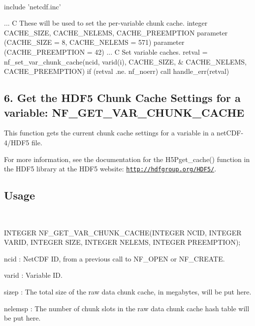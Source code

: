  

\begin{DoxyVerb}  include 'netcdf.inc'
\end{DoxyVerb}
 ... C These will be used to set the per-\/variable chunk cache. integer C\+A\+C\+H\+E\+\_\+\+S\+I\+ZE, C\+A\+C\+H\+E\+\_\+\+N\+E\+L\+E\+MS, C\+A\+C\+H\+E\+\_\+\+P\+R\+E\+E\+M\+P\+T\+I\+ON parameter (C\+A\+C\+H\+E\+\_\+\+S\+I\+ZE = 8, C\+A\+C\+H\+E\+\_\+\+N\+E\+L\+E\+MS = 571) parameter (C\+A\+C\+H\+E\+\_\+\+P\+R\+E\+E\+M\+P\+T\+I\+ON = 42) ... C Set variable caches. retval = nf\+\_\+set\+\_\+var\+\_\+chunk\+\_\+cache(ncid, varid(i), C\+A\+C\+H\+E\+\_\+\+S\+I\+ZE, \& C\+A\+C\+H\+E\+\_\+\+N\+E\+L\+E\+MS, C\+A\+C\+H\+E\+\_\+\+P\+R\+E\+E\+M\+P\+T\+I\+ON) if (retval .ne. nf\+\_\+noerr) call handle\+\_\+err(retval)

\subsection*{6. Get the H\+D\+F5 Chunk Cache Settings for a variable\+: N\+F\+\_\+\+G\+E\+T\+\_\+\+V\+A\+R\+\_\+\+C\+H\+U\+N\+K\+\_\+\+C\+A\+C\+HE }

This function gets the current chunk cache settings for a variable in a net\+C\+D\+F-\/4/\+H\+D\+F5 file.

For more information, see the documentation for the H5\+Pget\+\_\+cache() function in the H\+D\+F5 library at the H\+D\+F5 website\+: \href{http://hdfgroup.org/HDF5/}{\tt http\+://hdfgroup.\+org/\+H\+D\+F5/}.

\subsection*{Usage }

 

I\+N\+T\+E\+G\+ER N\+F\+\_\+\+G\+E\+T\+\_\+\+V\+A\+R\+\_\+\+C\+H\+U\+N\+K\+\_\+\+C\+A\+C\+HE(I\+N\+T\+E\+G\+ER N\+C\+ID, I\+N\+T\+E\+G\+ER V\+A\+R\+ID, I\+N\+T\+E\+G\+ER S\+I\+ZE, I\+N\+T\+E\+G\+ER N\+E\+L\+E\+MS, I\+N\+T\+E\+G\+ER P\+R\+E\+E\+M\+P\+T\+I\+ON);

{\ttfamily ncid} \+: Net\+C\+DF ID, from a previous call to N\+F\+\_\+\+O\+P\+EN or N\+F\+\_\+\+C\+R\+E\+A\+TE.

{\ttfamily varid} \+: Variable ID.

{\ttfamily sizep} \+: The total size of the raw data chunk cache, in megabytes, will be put here.

{\ttfamily nelemsp} \+: The number of chunk slots in the raw data chunk cache hash table will be put here.

